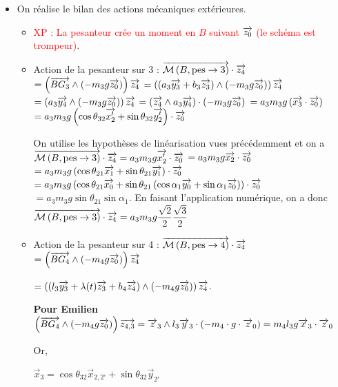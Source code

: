 \documentclass[10pt,fleqn]{article} %
\begin{document}
\begin{itemize}
\item On réalise le bilan des actions mécaniques extérieures. 
\begin{itemize}
\item \textcolor{red}{ XP : La pesanteur crée un moment en $B$ suivant  $\overrightarrow{z_0}$ (le schéma est trompeur)}.
\item Action de la pesanteur sur 3 : 
$\overrightarrow{\mathcal{M}\left( {B}, {\text{pes}} \rightarrow {3}\right)}\cdot \overrightarrow{z_4} $ $ =\left(\overrightarrow{BG_3}\wedge \left(-m_3g \overrightarrow{z_0}\right) \right)\overrightarrow{z_4}$ 
$ =\left(\left( a_3\overrightarrow{y_3} + b_3\overrightarrow{z_3}  \right)\wedge \left(-m_3g \overrightarrow{z_0}\right)\right)\overrightarrow{z_4}$
$ =\left( a_3\overrightarrow{y_4} \wedge \left(-m_3g \overrightarrow{z_0}\right)\right)\overrightarrow{z_4}$
$ =\left( \overrightarrow{z_4} \wedge a_3\overrightarrow{y_4}\right)\cdot  \left(-m_3g \overrightarrow{z_0}\right)$
$ = a_3 m_3g \left( \overrightarrow{x_3}\cdot \overrightarrow{z_0} \right)$
$ = a_3 m_3g \left(  \cos\theta_{32} \overrightarrow{x_2'} +\sin\theta_{32} \overrightarrow{y_2'} \right)\cdot \overrightarrow{z_0} $

On utilise les hypothèses de linéarisation vues précédemment et on a 
$\overrightarrow{\mathcal{M}\left( {B}, {\text{pes}} \rightarrow {3}\right)}\cdot \overrightarrow{z_4}= a_3 m_3g \overrightarrow{x_2'} \cdot \overrightarrow{z_0} $ 
$= a_3 m_3g \overrightarrow{x_2} \cdot \overrightarrow{z_0} $
$= a_3 m_3g \left( \cos \theta_{21} \overrightarrow{x_1} +\sin \theta_{21} \overrightarrow{y_1} \right)\cdot \overrightarrow{z_0} $
$= a_3 m_3g \left( \cos \theta_{21} \overrightarrow{x_0} +\sin \theta_{21}  \left( \cos \alpha_1 \overrightarrow{y_0} + \sin \alpha_1 \overrightarrow{z_0} \right) \right)\cdot \overrightarrow{z_0} $
$= a_3 m_3g \sin \theta_{21}   \sin \alpha_1    $. En faisant l'application numérique, on a donc 
$\overrightarrow{\mathcal{M}\left( {B}, {\text{pes}} \rightarrow {3}\right)}\cdot \overrightarrow{z_4}= a_3 m_3g  \dfrac{\sqrt{2}}{2} \dfrac{\sqrt{3}}{2}$

\item Action de la pesanteur sur 4 : 
$\overrightarrow{\mathcal{M}\left( {B}, {\text{pes}} \rightarrow {4}\right)}\cdot \overrightarrow{z_4} $ $ =\left(\overrightarrow{BG_4}\wedge \left(-m_4g \overrightarrow{z_0}\right) \right)\overrightarrow{z_4}$ 

$ =\left(\left(l_3\overrightarrow{y_3} + \lambda(t) \overrightarrow{z_3} + b_4\overrightarrow{z_4} \right)\wedge \left(-m_4g \overrightarrow{z_0}\right) \right)\overrightarrow{z_4}$. 

\textbf{Pour Emilien }
$
\left(\overrightarrow{BG_4}\wedge \left(-m_4g \overrightarrow{z_0}\right) \right)\overrightarrow{z_{4,3}}
=\overrightarrow{z}_3\wedge l_3\overrightarrow{y}_3\cdot \left(-m_4\cdot g\cdot \overrightarrow{z}_0\right)=m_4l_3g\overrightarrow{x}_3\cdot \overrightarrow{z}_0
$

Or,

$\overrightarrow{x}_3=\cos\theta_{32}\overrightarrow{x}_{2,2'}+\sin\theta_{32}\overrightarrow{y}_{2'}$


\end{itemize}
\end{itemize}
\end{document}
